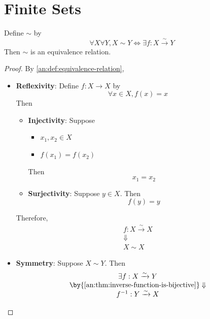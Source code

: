 \section{Finite Sets}

\begin{theorem} \label{an:thm:bijection-equivalence-relation}
  Define $\sim$ by
  \[
    \forall X \forall Y, X \sim Y \iff \exists f: X \xrightarrow{\sim} Y
  \]
  Then $\sim$ is an equivalence relation.
\end{theorem}

\begin{proof}
  By \cref{an:def:equivalence-relation},
  \begin{itemize}
    \item \textbf{Reflexivity}: Define $f: X \to X$ by
          \[
            \forall x \in X, f(x) = x
          \]
          Then
          \begin{itemize}
            \item \textbf{Injectivity}: Suppose
                  \begin{itemize}
                    \item $x_{1}, x_{2} \in X$
                    \item $f(x_{1}) = f(x_{2})$
                  \end{itemize}
                  Then
                  \[
                    x_{1} = x_{2}
                  \]
            \item \textbf{Surjectivity}: Suppose $y \in X$. Then
                  \[
                    f(y) = y
                  \]
          \end{itemize}
          Therefore,
          \[
            \begin{array}{c}
              f: X \xrightarrow{\sim} X \\
              \Downarrow                \\
              X \sim X
            \end{array}
          \]
    \item \textbf{Symmetry}: Suppose $X \sim Y$. Then
          \[
            \begin{array}{c}
              \exists f: X \xrightarrow{\sim} Y                           \\
              \by{\Cref{an:thm:inverse-function-is-bijective}} \Downarrow \\
              f^{-1}: Y \xrightarrow{\sim} X                              \\

\end{array}\]
\end{itemize}
\end{proof}
